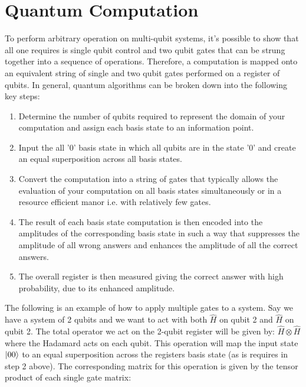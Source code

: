\section{Quantum Computation}

To perform arbitrary operation on multi-qubit systems, it's possible to show that all one requires is single qubit control and two qubit gates that can be strung together into a sequence of operations. Therefore, a computation is mapped onto an equivalent string of single and two qubit gates performed on a register of qubits. In general, quantum algorithms can be broken down into the following key steps:

\begin{enumerate}
    \item Determine the number of qubits required to represent the domain of your computation and assign each basis state to an information point.
    \item Input the all '0' basis state in which all qubits are in the state '0' and create an equal superposition across all basis states.
    \item Convert the computation into a string of gates that typically allows the evaluation of your computation on all basis states simultaneously or in a resource efficient manor i.e. with relatively few gates.
    \item The result of each basis state computation is then encoded into the amplitudes of the corresponding basis state in such a way that suppresses the amplitude of all wrong answers and enhances the amplitude of all the correct answers.
    \item The overall register is then measured giving the correct answer with high probability, due to its enhanced amplitude. 
\end{enumerate}

The following is an example of how to apply multiple gates to a system. Say we have a system of 2 qubits and we want to act with both $\hat{H}$ on qubit 2 and $\hat{H}$ on qubit 2. The total operator we act on the 2-qubit register will be given by: $\hat{H}\otimes\hat{H}$ where the Hadamard acts on each qubit. This operation will map the input state $\left\vert{00}\right\rangle$ to an equal superposition across the registers basis state (as is requires in step 2 above). The corresponding matrix for this operation is given by the tensor product of each single gate matrix: 

